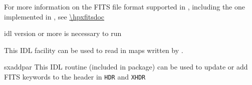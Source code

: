 \begin{codedescription}
{For more information on the FITS file format supported in \healpixns, 
including the one implemented in \facname,
see \url{\hpxfitsdoc}}

\end{codedescription}



\begin{related}
  \begin{sulist}{} %
  \item[idl] version \idlversion or more is necessary to run \facname
  \item[\htmlref{read\_fits\_partial}{idl:read_fits_partial}] This \healpix IDL facility can be used to read in maps
  written by \facname.

  \item[sxaddpar] This IDL routine (included in \healpix package) can be used to update
  or add FITS keywords to the header in {\tt HDR} and {\tt XHDR}
  \end{sulist}
\end{related}


